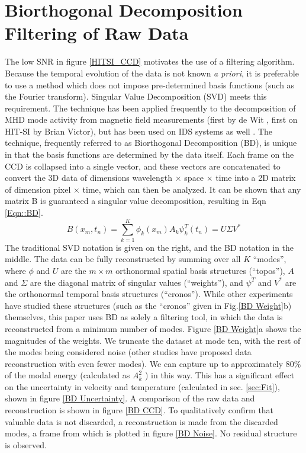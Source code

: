 \section{Biorthogonal Decomposition Filtering of Raw Data}\label{sec::BD}
\hspace{4ex}The low SNR in figure \ref{HITSI_CCD} motivates the use of a filtering algorithm. Because the temporal evolution of the data is not known \textit{a priori}, it is preferable to use a method which does not impose pre-determined basis functions (such as the Fourier transform). Singular Value Decomposition (SVD) meets this requirement. The technique has been applied frequently to the decomposition of MHD mode activity from magnetic field measurements (first by de Wit \cite{de1994biorthogonal}, first on HIT-SI by Brian Victor\cite{BVictor}), but has been used on IDS systems as well \cite{fenzi20012d}. The technique, frequently referred to as Biorthogonal Decomposition (BD), is unique in that the basis functions are determined by the data itself. Each frame on the CCD is collapsed into a single vector, and these vectors are concatenated to convert the 3D data of dimensions wavelength $\times$ space $\times$ time into a 2D matrix of dimension pixel $\times$ time, which can then be analyzed. It can be shown\cite{kutz2013data} that any matrix B is guaranteed a singular value decomposition, resulting in Eqn \ref{Eqn::BD}.
\begin{equation}\label{Eqn::BD}
B(x_m,t_n)= \sum^K_{k=1}\phi_k(x_m)A_k\psi_k^T(t_n) = U\Sigma{V^*}
\end{equation}
The traditional SVD notation is given on the right, and the BD notation in the middle. The data can be fully reconstructed by summing over all $K$ ``modes'', where $\phi$ and $U$ are the $m\times{m}$ orthonormal spatial basis structures (``topos''), $A$ and $\Sigma$ are the diagonal matrix of singular values (``weights''), and $\psi^T$ and $V^*$ are the orthonormal temporal basis structures (``cronos''). While other experiments have studied these structures (such as the ``cronos'' given in Fig.\ref{BD Weight}b) themselves\cite{fenzi20012d}, this paper uses BD as solely a filtering tool, in which the data is reconstructed from a minimum number of modes. Figure \ref{BD Weight}a shows the magnitudes of the weights. We truncate the dataset at mode ten, with the rest of the modes being considered noise (other studies have proposed data reconstruction with even fewer modes\cite{gavish2014optimal}). We can capture up to approximately $80\%$ of the modal energy (calculated as $A_k^2$ \cite{de1994biorthogonal}) in this way. This has a significant effect on the uncertainty in velocity and temperature (calculated in sec. \ref{sec:Fit}), shown in figure \ref{BD Uncertainty}. A comparison of the raw data and reconstruction is shown in figure \ref{BD CCD}. To qualitatively confirm that valuable data is not discarded, a reconstruction is made from the discarded modes, a frame from which is plotted in figure \ref{BD Noise}. No residual structure is observed.
